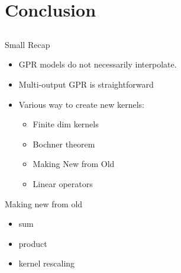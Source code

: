\documentclass{beamer}
\begin{document}
\section{Conclusion}
\subsection{}

\begin{frame}{}
\begin{block}{Small Recap}
\begin{itemize}
 \item GPR models do not necessarily interpolate. \vspace{2mm}
 \item Multi-output GPR is straightforward
 \item Various way to create new kernels:
 \begin{itemize}
 	\item Finite dim kernels
 	\item Bochner theorem
 	\item Making New from Old
 	\item Linear operators
 \end{itemize}
\end{itemize}
\end{block}

\begin{block}{Making new from old}
\begin{itemize}
 \item sum
 \item product
 \item kernel rescaling
\end{itemize}
\end{block}
\end{frame}
\end{document}
